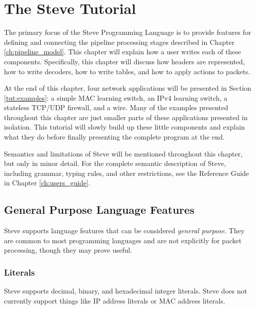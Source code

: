 \chapter{The Steve Tutorial} \label{ch:tutorial}

%

The primary focus of the Steve Programming Language is to provide features for
defining and connecting the pipeline processing stages described in Chapter
\ref{ch:pipeline_model}. This chapter will explain how a user writes each of these
components. Specifically, this chapter will discuss how headers are represented, how to
write decoders, how to write tables, and how to apply actions to packets.

At the end of this chapter, four network applications will be presented in Section \ref{tut:examples}: a simple MAC
learning switch, an IPv4 learning switch, a stateless TCP/UDP firewall, and a wire. Many of the examples
presented throughout this chapter are just smaller parts of these applications
presented in isolation. This tutorial will slowly build
up these little components and explain what they do before finally presenting
the complete program at the end.

Semantics and limitations of Steve will be mentioned throughout this chapter, 
but only in minor detail. For the complete semantic description of
Steve, including grammar, typing rules, and other restrictions, see the Reference Guide in Chapter \ref{ch:users_guide}.

\section{General Purpose Language Features} \label{tut:gen_purp}

Steve supports language features that can be considered
\textit{general purpose}. They are common to most programming
languages and are not explicitly for packet processing, though they may prove
useful.

\subsection{Literals} \label{tut:literal}

Steve supports decimal, binary, and hexadecimal integer literals. Steve does not
currently support things like IP address literals or MAC address literals.

